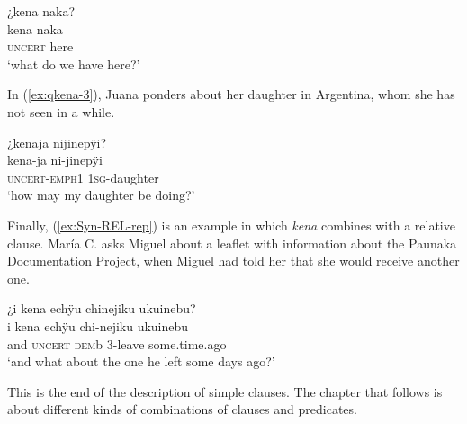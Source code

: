 \ea\label{ex:qkena-2}
\begingl
\glpreamble ¿kena naka?\\
\gla kena naka\\
\glb \textsc{uncert} here\\
\glft ‘what do we have here?’
\endgl
\trailingcitation{[jxx-a120516l-a.033]}
\xe

In (\ref{ex:qkena-3}), Juana ponders about her daughter in Argentina, whom she has not seen in a while.

\ea\label{ex:qkena-3}
\begingl
\glpreamble ¿kenaja nijinepÿi?\\
\gla kena-ja ni-jinepÿi\\
\glb \textsc{uncert}-\textsc{emph}1 1\textsc{sg}-daughter\\
\glft ‘how may my daughter be doing?’
\endgl
\trailingcitation{[jxx-e120516l-1.022]}
\xe

Finally, (\ref{ex:Syn-REL-rep}) is an example in which \textit{kena} combines with a relative clause. María C. asks Miguel about a leaflet with information about the Paunaka Documentation Project, when Miguel had told her that she would receive another one.

\ea\label{ex:Syn-REL-rep}
\begingl
\glpreamble ¿i kena echÿu chinejiku ukuinebu?\\
\gla i kena echÿu chi-nejiku ukuinebu\\
\glb and \textsc{uncert} \textsc{dem}b 3-leave some.time.ago\\
\glft ‘and what about the one he left some days ago?’
\endgl
\trailingcitation{[mux-c110810l.131]}
\xe
{}



This is the end of the description of simple clauses. The chapter that follows is about different kinds of combinations of clauses and predicates.
